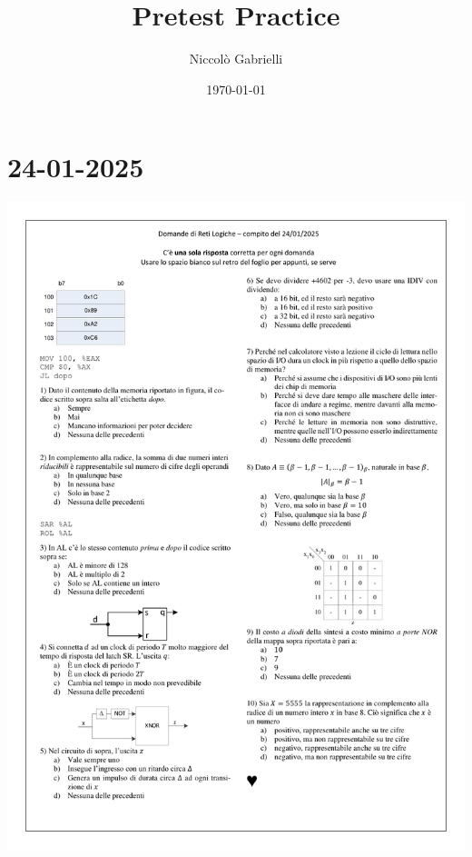 \documentclass[a4paper,12pt]{article}
\title{Pretest Practice}
\author{Niccolò Gabrielli}
\date{\today}
\begin{document}
\maketitle

\tableofcontents
\newpage


\section{24-01-2025}

\includegraphics[width = \textwidth]{pretestImage/Domande RL 20250124.pdf}
\end{document}
